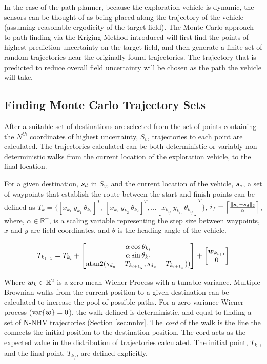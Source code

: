 In the case of the path planner, because the exploration vehicle is dynamic, the sensors can be thought of as being placed along the trajectory of the vehicle (assuming reasonable ergodicity of the target field). The Monte Carlo approach to path finding via the Kriging Method introduced will first find the points of highest prediction uncertainty on the target field, and then generate a finite set of random trajectories near the originally found trajectories. The trajectory that is predicted to reduce overall field uncertainty will be chosen as the path the vehicle will take.

\subsection{Finding Monte Carlo Trajectory Sets} \label{sec:mctrajsets}
After a suitable set of destinations are selected from the set of points containing the $N^{th}$ coordinates of highest uncertainty, $S_{v}$, trajectories to each point are calculated. The trajectories calculated can be both deterministic or variably non-deterministic walks from the current location of the exploration vehicle, to the final location.

For a given destination, ${\it{\boldsymbol{s}}}_d$ in $S_{v}$, and the current location of the vehicle, ${\it{\boldsymbol{s}}}_{c}$, a set of waypoints that establish the route between the start and finish points can be defined as $T_k = \Big\{[x_{k_1}\ y_{k_1}\ \theta_{k_1}]^T,\ [x_{k_2}\ y_{k_2}\ \theta_{k_2}]^T, \dots [x_{k_{i_f}}\ y_{k_{i_f}}\ \theta_{k_{i_f}}]^T \Big\}$, $i_f = \Big\lceil \frac{\|{\it{\boldsymbol{s}}}_c - {\it{\boldsymbol{s}}}_d\|_2}{\alpha} \Big\rceil$, where, $\alpha \in \mathbb{R}^{+}$, is a scaling variable representing the step size between waypoints, $x$ and $y$ are field coordinates, and $\theta$ is the heading angle of the vehicle. 

\begin{equation}
	T_{k_{i + 1}} = T_{k_i} +
	\begin{bmatrix}
		\alpha \cos \theta_{k_i} \\
		\alpha \sin \theta_{k_i} \\
		\text{atan2}(s_{d_y} - T_{k_{{i+1}_y}}, s_{d_x} - T_{k_{{i+1}_x}}))
	\end{bmatrix} + \begin{bmatrix} 
		{\it{\boldsymbol{w}}}_{k_{i+1}} \\
		0
	\end{bmatrix}
\end{equation}

\noindent Where ${\it{\boldsymbol{w}}}_k \in \mathbb{R}^2$ is a zero-mean Wiener Process with a tunable variance. Multiple Brownian walks from the current position to a given destination can be calculated to increase the pool of possible paths. For a zero variance Wiener process ($\text{var}\{{\it{\boldsymbol{w}}}\}=0$), the walk defined is deterministic, and equal to finding a set of N-NHV trajectories (Section \ref{sec:nnhv}. The \textit{cord} of the walk is the line the connects the initial position to the destination position. The cord acts as the expected value in the distribution of trajectories calculated. The initial point, $T_{k_1}$, and the final point, $T_{k_f}$, are defined explicitly.

